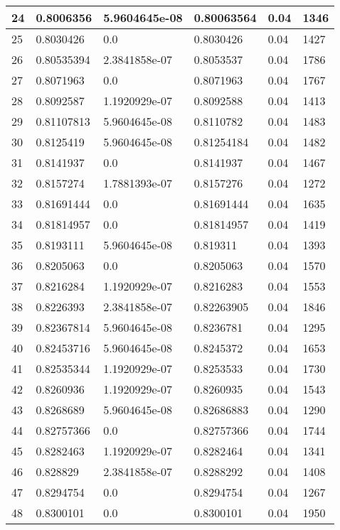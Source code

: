 \begin{longtable}{|l|l|l|l|l|l|}
24 & 0.8006356 & 5.9604645e-08 & 0.80063564 & 0.04 & 1346 \\ \hline 
25 & 0.8030426 & 0.0 & 0.8030426 & 0.04 & 1427 \\ \hline 
26 & 0.80535394 & 2.3841858e-07 & 0.8053537 & 0.04 & 1786 \\ \hline 
27 & 0.8071963 & 0.0 & 0.8071963 & 0.04 & 1767 \\ \hline 
28 & 0.8092587 & 1.1920929e-07 & 0.8092588 & 0.04 & 1413 \\ \hline 
29 & 0.81107813 & 5.9604645e-08 & 0.8110782 & 0.04 & 1483 \\ \hline 
30 & 0.8125419 & 5.9604645e-08 & 0.81254184 & 0.04 & 1482 \\ \hline 
31 & 0.8141937 & 0.0 & 0.8141937 & 0.04 & 1467 \\ \hline 
32 & 0.8157274 & 1.7881393e-07 & 0.8157276 & 0.04 & 1272 \\ \hline 
33 & 0.81691444 & 0.0 & 0.81691444 & 0.04 & 1635 \\ \hline 
34 & 0.81814957 & 0.0 & 0.81814957 & 0.04 & 1419 \\ \hline 
35 & 0.8193111 & 5.9604645e-08 & 0.819311 & 0.04 & 1393 \\ \hline 
36 & 0.8205063 & 0.0 & 0.8205063 & 0.04 & 1570 \\ \hline 
37 & 0.8216284 & 1.1920929e-07 & 0.8216283 & 0.04 & 1553 \\ \hline 
38 & 0.8226393 & 2.3841858e-07 & 0.82263905 & 0.04 & 1846 \\ \hline 
39 & 0.82367814 & 5.9604645e-08 & 0.8236781 & 0.04 & 1295 \\ \hline 
40 & 0.82453716 & 5.9604645e-08 & 0.8245372 & 0.04 & 1653 \\ \hline 
41 & 0.82535344 & 1.1920929e-07 & 0.8253533 & 0.04 & 1730 \\ \hline 
42 & 0.8260936 & 1.1920929e-07 & 0.8260935 & 0.04 & 1543 \\ \hline 
43 & 0.8268689 & 5.9604645e-08 & 0.82686883 & 0.04 & 1290 \\ \hline 
44 & 0.82757366 & 0.0 & 0.82757366 & 0.04 & 1744 \\ \hline 
45 & 0.8282463 & 1.1920929e-07 & 0.8282464 & 0.04 & 1341 \\ \hline 
46 & 0.828829 & 2.3841858e-07 & 0.8288292 & 0.04 & 1408 \\ \hline 
47 & 0.8294754 & 0.0 & 0.8294754 & 0.04 & 1267 \\ \hline 
48 & 0.8300101 & 0.0 & 0.8300101 & 0.04 & 1950 \\ \hline 

\end{longtable}
